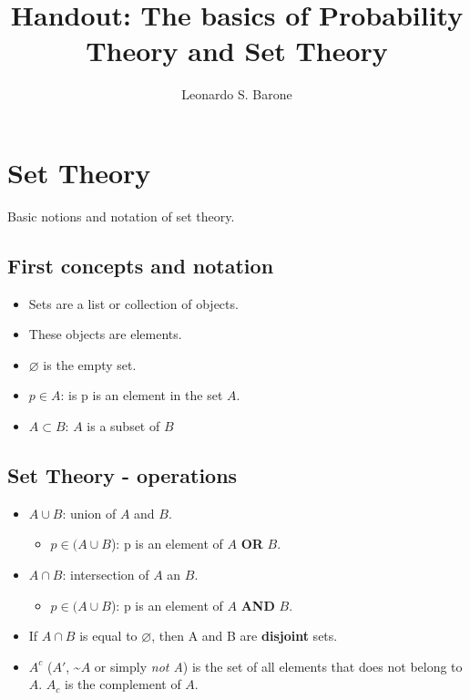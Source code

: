 \documentclass[11pt]{article}
\title{\textbf{Handout: The basics of Probability Theory and Set Theory}}
\author{Leonardo S. Barone}
\date{}
\let\emptyset\varnothing
\begin{document}
\maketitle

\section{Set Theory}

Basic notions and notation of set theory.

\subsection{First concepts and notation}

	\begin{itemize}
		\item Sets are a list or collection of objects.
		\item These objects are elements.
		\item $\emptyset$ is the empty set.
		\item $p \in A$: is p is an element in the set $A$.
		\item $A \subset B$: $A$ is a subset of $B$ 
	\end{itemize}


\subsection{Set Theory - operations}

	\begin{itemize}
		\item $A \cup B$: union of $A$ and $B$.
		\begin{itemize}
			\item $p \in (A \cup B$): p is an element of $A$ \textbf{OR} $B$.
		\end{itemize}
		\item $A \cap B$: intersection of $A$ an $B$.
		\begin{itemize}
			\item $p \in (A \cup B$): p is an element of $A$ \textbf{AND} $B$.
		\end{itemize}
		\item If $A \cap B$ is equal to $\emptyset$, then A and B are \textbf{disjoint} sets.
		\item $A^c$ ($A'$, \textasciitilde$A$ or simply \emph{not A}) is the set of all elements that does not belong to $A$. $A_c$ is the complement of $A$. 

	\end{itemize}
\end{document}

